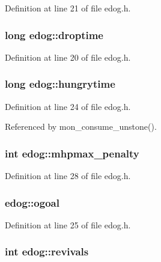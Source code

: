 Definition at line 21 of file edog.\+h.

\hypertarget{structedog_a3661b488f324c0f7556262ca40a7d10e}{
\subsubsection[{droptime}]{\setlength{\rightskip}{0pt plus 5cm}long edog\+::droptime}}\label{structedog_a3661b488f324c0f7556262ca40a7d10e}


Definition at line 20 of file edog.\+h.

\hypertarget{structedog_ae93e5b475d6c1c0fb7f97d1c51d97726}{
\subsubsection[{hungrytime}]{\setlength{\rightskip}{0pt plus 5cm}long edog\+::hungrytime}}\label{structedog_ae93e5b475d6c1c0fb7f97d1c51d97726}


Definition at line 24 of file edog.\+h.



Referenced by mon\+\_\+consume\+\_\+unstone().

\hypertarget{structedog_a1bb0f59467f6292aad50913ab316a5e4}{
\subsubsection[{mhpmax\+\_\+penalty}]{\setlength{\rightskip}{0pt plus 5cm}int edog\+::mhpmax\+\_\+penalty}}\label{structedog_a1bb0f59467f6292aad50913ab316a5e4}


Definition at line 28 of file edog.\+h.

\hypertarget{structedog_af1ac4712c75eb32748f966a880837e4e}{
\subsubsection[{ogoal}]{ edog\+::ogoal}}\label{structedog_af1ac4712c75eb32748f966a880837e4e}


Definition at line 25 of file edog.\+h.

\hypertarget{structedog_a1c7345aeb0c478b1ff79bead006e8d4e}{
\subsubsection[{revivals}]{\setlength{\rightskip}{0pt plus 5cm}int edog\+::revivals}}\label{structedog_a1c7345aeb0c478b1ff79bead006e8d4e}



